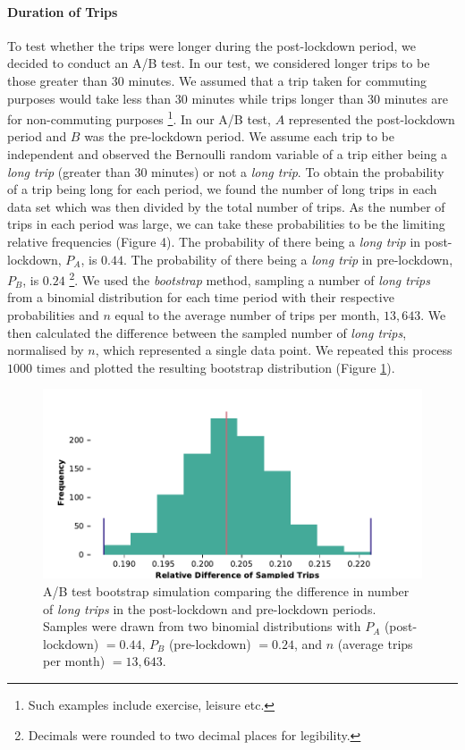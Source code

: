 \documentclass[11pt,a4paper]{article}
\begin{document}
\paragraph{Duration of Trips} To test whether the trips were longer during the post-lockdown period, we decided to conduct an A/B test. In our test, we considered longer trips to be those greater than 30 minutes. We assumed that a trip taken for commuting purposes would take less than 30 minutes while  trips longer than 30 minutes are for non-commuting purposes \footnote{Such examples include exercise, leisure etc.}. In our A/B test, $A$ represented the post-lockdown period and $B$ was the pre-lockdown period. We assume each trip to be independent and observed the Bernoulli random variable of a trip either being a \emph{long trip} (greater than 30 minutes) or not a \emph{long trip}. To obtain the probability of a trip being long for each period, we found the number of long trips in each data set which was then divided by the total number of trips. As the number of trips in each period was large, we can take these probabilities to be the limiting relative frequencies (Figure 4). The probability of there being a \emph{long trip} in post-lockdown, $P_A$, is $0.44$. The probability of there being a \emph{long trip} in pre-lockdown, $P_B$, is $0.24$ \footnote{Decimals were rounded to two decimal places for legibility.}. We used the \emph{bootstrap} method, sampling a number of \emph{long trips} from a binomial distribution for each time period with their respective probabilities and $n$ equal to the average number of trips per month, $13,643$. We then calculated the difference between the sampled number of \emph{long trips}, normalised by $n$, which represented a single data point. We repeated this process $1000$ times and plotted the resulting bootstrap distribution (Figure \ref{fds-project:fig:bootstrap}). 

\begin{figure}[ht]
  \includegraphics{bootstrap.pdf}
  \caption{A/B test bootstrap simulation comparing the difference in number of \emph{long trips} in the post-lockdown and pre-lockdown periods. Samples were drawn from two binomial distributions with $P_A$ (post-lockdown) $= 0.44$, $P_B$ (pre-lockdown) $= 0.24$, and $n$ (average trips per month) $=13,643$. }
  \label{fds-project:fig:bootstrap}
\end{figure}
\end{document}
